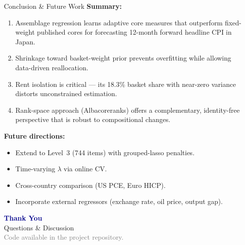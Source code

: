 \documentclass[aspectratio=169, 11pt]{beamer}
\begin{document}
\begin{frame}{Conclusion \& Future Work}
  \textbf{Summary:}
  \begin{enumerate}
    \item Assemblage regression learns \alert{adaptive core measures} that outperform
          fixed-weight published cores for forecasting 12-month forward headline
          CPI in Japan.
    \item Shrinkage toward basket-weight prior prevents overfitting while allowing
          data-driven reallocation.
    \item Rent isolation is critical --- its 18.3\% basket share with near-zero
          variance distorts unconstrained estimation.
    \item Rank-space approach (Albacoreranks) offers a complementary, identity-free
          perspective that is robust to compositional changes.
  \end{enumerate}

  \vspace{6pt}
  \textbf{Future directions:}
  \begin{itemize}
    \item Extend to Level~3 (744 items) with grouped-lasso penalties.
    \item Time-varying $\lambda$ via online CV.
    \item Cross-country comparison (US PCE, Euro HICP).
    \item Incorporate external regressors (exchange rate, oil price, output gap).
  \end{itemize}
\end{frame}

\begin{frame}[plain]
  \centering
  \vspace{2cm}
  {\Huge\bfseries\textcolor{darkblue}{Thank You}}\\[12pt]
  {\large Questions \& Discussion}\\[24pt]
  \textcolor{gray}{\small Code available in the project repository.}
\end{frame}
\end{document}
